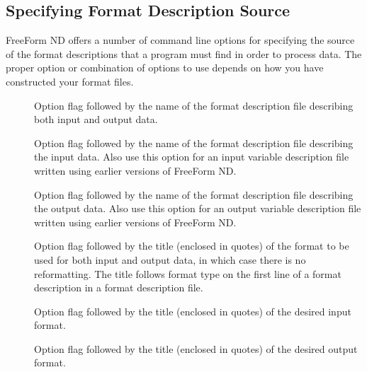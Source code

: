 \subsection{Specifying Format Description Source}
\label{ff,convs,specifying}

FreeForm ND offers a number of command line options for specifying the
source of the format descriptions that a program must find in order to
process data. The proper option or combination of options to use
depends on how you have constructed your format files.

\begin{description}

\item[\dashf]
  
  Option flag followed by the name of the format description file
  describing both input and output data.

\item[\dashif]
  
  Option flag followed by the name of the format description file
  describing the input data. Also use this option for an input
  variable description file written using earlier versions of FreeForm
  ND.

\item[\dashof]
  
  Option flag followed by the name of the format description file
  describing the output data. Also use this option for an output
  variable description file written using earlier versions of FreeForm
  ND.

\item[\dashft]
  
  Option flag followed by the title (enclosed in quotes) of the format
  to be used for both input and output data, in which case there is no
  reformatting. The title follows format type on the first line of a
  format description in a format description file.

\item[\dashift]
  
  Option flag followed by the title (enclosed in quotes) of the
  desired input format.

\item[\dashoft]
  
  Option flag followed by the title (enclosed in quotes) of the
  desired output format.
\end{description}

